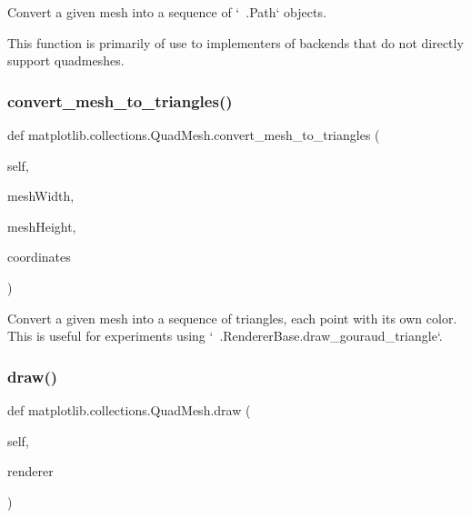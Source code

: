 \begin{DoxyVerb}Convert a given mesh into a sequence of `~.Path` objects.

This function is primarily of use to implementers of backends that do
not directly support quadmeshes.
\end{DoxyVerb}
 \mbox{\label{classmatplotlib_1_1collections_1_1QuadMesh_a1d06579b71cff52449727d09e8f7e1d6}} 
\subsubsection{\texorpdfstring{convert\+\_\+mesh\+\_\+to\+\_\+triangles()}{convert\_mesh\_to\_triangles()}}
{\footnotesize\ttfamily def matplotlib.\+collections.\+Quad\+Mesh.\+convert\+\_\+mesh\+\_\+to\+\_\+triangles (\begin{DoxyParamCaption}\item[{}]{self,  }\item[{}]{mesh\+Width,  }\item[{}]{mesh\+Height,  }\item[{}]{coordinates }\end{DoxyParamCaption})}

\begin{DoxyVerb}Convert a given mesh into a sequence of triangles, each point
with its own color.  This is useful for experiments using
`~.RendererBase.draw_gouraud_triangle`.
\end{DoxyVerb}
 \mbox{\label{classmatplotlib_1_1collections_1_1QuadMesh_a6b7f7f745969d0306fe8cc4f356f566e}} 
\subsubsection{\texorpdfstring{draw()}{draw()}}
{\footnotesize\ttfamily def matplotlib.\+collections.\+Quad\+Mesh.\+draw (\begin{DoxyParamCaption}\item[{}]{self,  }\item[{}]{renderer }\end{DoxyParamCaption})}

